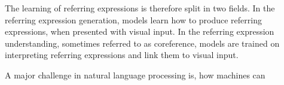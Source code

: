 The learning of referring expressions is therefore split in two fields.
In the referring expression generation, models learn how to produce referring expressions, when presented with visual input.
In the referring expression understanding, sometimes referred to as coreference, models are trained on interpreting referring expressions and link them to visual input.

A major challenge in natural language processing is, how machines can

